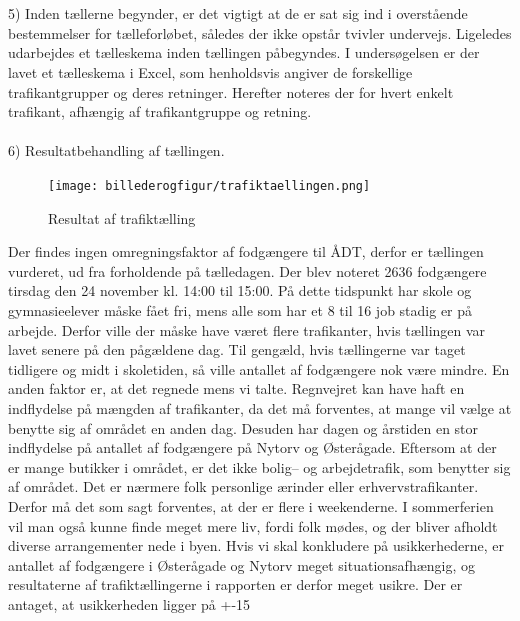\\\\
5) Inden tællerne begynder, er det vigtigt at de er sat sig ind i overstående bestemmelser for tælleforløbet, således der ikke opstår tvivler undervejs. Ligeledes udarbejdes et tælleskema inden tællingen påbegyndes. I undersøgelsen er der lavet et tælleskema i Excel, som henholdsvis angiver de forskellige trafikantgrupper og deres retninger. Herefter noteres der for hvert enkelt trafikant, afhængig af trafikantgruppe og retning.
\\\\
6) Resultatbehandling af tællingen.
\begin{figure}[htbp]
   \label{fig:trafiktaellingen}
   \centering
   \begin{adjustbox}{max width=\textwidth}
     \texttt{[image: billederogfigur/trafiktaellingen.png]}
  \end{adjustbox}
   \caption{Resultat af trafiktælling}
 \end{figure}
Der findes ingen omregningsfaktor af fodgængere til ÅDT, derfor er tællingen vurderet, ud fra forholdende på tælledagen. Der blev noteret 2636 fodgængere tirsdag den 24 november kl. 14:00 til 15:00. På dette tidspunkt har skole og gymnasieelever måske fået fri, mens alle som har et 8 til 16 job stadig er på arbejde. Derfor ville der måske have været flere trafikanter, hvis tællingen var lavet senere på den pågældene dag. Til gengæld, hvis tællingerne var taget tidligere og midt i skoletiden, så ville antallet af fodgængere nok være mindre. En anden faktor er, at det regnede mens vi talte. Regnvejret kan have haft en indflydelse på mængden af trafikanter, da det må forventes, at mange vil vælge at benytte sig af området en anden dag. Desuden har dagen og årstiden en stor indflydelse på antallet af fodgængere på Nytorv og Østerågade. Eftersom at der er mange butikker i området, er det ikke bolig– og arbejdetrafik, som benytter sig af området. Det er nærmere folk personlige ærinder eller erhvervstrafikanter. Derfor må det som sagt forventes, at der er flere i weekenderne. I sommerferien vil man også kunne finde meget mere liv, fordi folk mødes, og der bliver afholdt diverse arrangementer nede i byen. Hvis vi skal konkludere på usikkerhederne, er antallet af fodgængere i Østerågade og Nytorv meget situationsafhængig, og resultaterne af trafiktællingerne i rapporten er derfor meget usikre. Der er antaget, at usikkerheden ligger på +-15%
